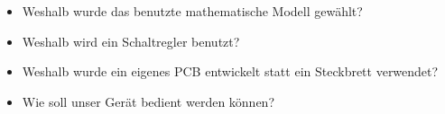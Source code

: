 \begin{itemize}
    \item
        Weshalb wurde das benutzte mathematische Modell gew\"ahlt?
    \item
        Weshalb wird ein Schaltregler benutzt?
    \item
        Weshalb wurde ein eigenes PCB entwickelt statt ein Steckbrett verwendet?
    \item
        Wie soll unser Ger\"at bedient werden k\"onnen?
\end{itemize}
